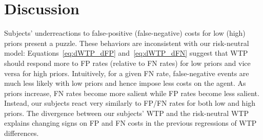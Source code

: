 \documentclass[12pt,a4paper]{article}
\begin{document}
\section{Discussion}


Subjects' underreactions to false-positive (false-negative) costs for low (high) priors present a puzzle. These behaviors are inconsistent with our risk-neutral model: Equations~\ref{eq:dWTP_dFP} and~\ref{eq:dWTP_dFN} suggest that WTP should respond more to FP rates (relative to FN rates) for low priors and vice versa for high priors. Intuitively, for a given FN rate, false-negative events are much less likely with low priors and hence impose less costs on the agent. As priors increase, FN rates become more salient while FP rates become less salient. Instead, our subjects react very similarly to FP/FN rates for both low and high priors. The divergence between our subjects' WTP and the risk-neutral WTP explains changing signs on FP and FN costs in the previous regressions of WTP differences.




\end{document}

